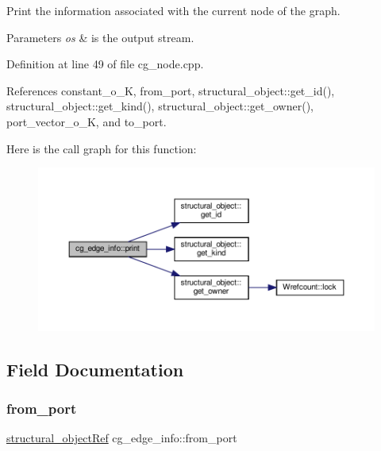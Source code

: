 Print the information associated with the current node of the graph. 


\begin{DoxyParams}{Parameters}
{\em os} & is the output stream. \\
\hline
\end{DoxyParams}


Definition at line 49 of file cg\+\_\+node.\+cpp.



References constant\+\_\+o\+\_\+K, from\+\_\+port, structural\+\_\+object\+::get\+\_\+id(), structural\+\_\+object\+::get\+\_\+kind(), structural\+\_\+object\+::get\+\_\+owner(), port\+\_\+vector\+\_\+o\+\_\+K, and to\+\_\+port.

Here is the call graph for this function\+:
\nopagebreak
\begin{figure}[H]
\begin{center}
\leavevmode
\includegraphics[width=350pt]{dd/dc7/structcg__edge__info_aa13ae24ca61d06f84662a86227515b5d_cgraph}
\end{center}
\end{figure}


\subsection{Field Documentation}
\mbox{\label{structcg__edge__info_a995cf47a7796ebb3c558e8f870d2d30a}} 
\subsubsection{\texorpdfstring{from\+\_\+port}{from\_port}}
{\footnotesize\ttfamily \hyperlink{structural__objects_8hpp_a8ea5f8cc50ab8f4c31e2751074ff60b2}{structural\+\_\+object\+Ref} cg\+\_\+edge\+\_\+info\+::from\+\_\+port}



